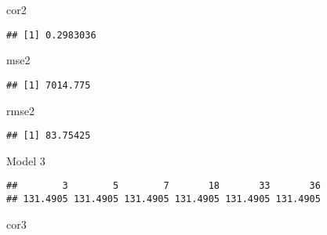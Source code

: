 \documentclass[
]{article}
\newenvironment{Shaded}{\begin{snugshade}}{\end{snugshade}}
\newcommand{\AttributeTok}[1]{\textcolor[rgb]{0.77,0.63,0.00}{#1}}
\newcommand{\DecValTok}[1]{\textcolor[rgb]{0.00,0.00,0.81}{#1}}
\newcommand{\FunctionTok}[1]{\textcolor[rgb]{0.00,0.00,0.00}{#1}}
\newcommand{\NormalTok}[1]{#1}
\newcommand{\OtherTok}[1]{\textcolor[rgb]{0.56,0.35,0.01}{#1}}
\newcommand{\SpecialCharTok}[1]{\textcolor[rgb]{0.00,0.00,0.00}{#1}}
\begin{document}
\begin{Shaded}
\begin{Highlighting}[]
\NormalTok{cor2}
\end{Highlighting}
\end{Shaded}

\begin{verbatim}
## [1] 0.2983036
\end{verbatim}

\begin{Shaded}
\begin{Highlighting}[]
\NormalTok{mse2}
\end{Highlighting}
\end{Shaded}

\begin{verbatim}
## [1] 7014.775
\end{verbatim}

\begin{Shaded}
\begin{Highlighting}[]
\NormalTok{rmse2}
\end{Highlighting}
\end{Shaded}

\begin{verbatim}
## [1] 83.75425
\end{verbatim}

Model 3

\begin{Shaded}
\end{Shaded}

\begin{verbatim}
##        3        5        7       18       33       36 
## 131.4905 131.4905 131.4905 131.4905 131.4905 131.4905
\end{verbatim}

\begin{Shaded}
\begin{Highlighting}[]
\NormalTok{cor3}
\end{Highlighting}
\end{Shaded}
\end{document}

